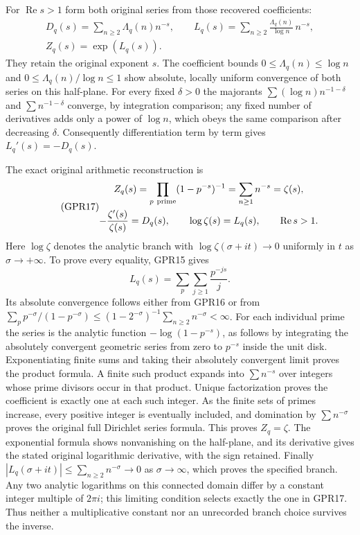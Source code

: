 For $\operatorname{Re}s>1$ form both original series
from those recovered coefficients:
\begin{equation}\tag{GPR16}
 \begin{gathered}
 D_q(s)=\sum_{n\ge2}\Lambda_q(n)n^{-s},\qquad
 L_q(s)=\sum_{n\ge2}\frac{\Lambda_q(n)}{\log n}\,n^{-s},\\
 Z_q(s)=\exp(L_q(s)).
 \end{gathered}
\end{equation}
They retain the original exponent $s$.
The coefficient bounds
$0\le\Lambda_q(n)\le\log n$ and
$0\le\Lambda_q(n)/\log n\le1$
show absolute, locally uniform convergence of both
series on this half-plane. For every fixed
$\delta>0$ the majorants
$\sum(\log n)n^{-1-\delta}$ and
$\sum n^{-1-\delta}$ converge, by integration
comparison; any fixed number of derivatives adds
only a power of $\log n$, which obeys the same
comparison after decreasing $\delta$.
Consequently differentiation term by term gives
$L_q'(s)=-D_q(s)$.

The exact original arithmetic reconstruction is
\begin{equation}\tag{GPR17}
 \begin{gathered}
 Z_q(s)=\prod_{p\ {\rm prime}}(1-p^{-s})^{-1}
       =\sum_{n\ge1}n^{-s}=\zeta(s),\\
 -\frac{\zeta'(s)}{\zeta(s)}=D_q(s),\qquad
 \log\zeta(s)=L_q(s),\qquad \operatorname{Re}s>1.
 \end{gathered}
\end{equation}
Here $\log\zeta$ denotes the analytic branch with
$\log\zeta(\sigma+it)\to0$ uniformly in $t$ as
$\sigma\to+\infty$.
To prove every equality, GPR15 gives
\[
 L_q(s)=\sum_p\sum_{j\ge1}\frac{p^{-js}}j.
\]
Its absolute convergence follows either from GPR16 or
from
$\sum_p p^{-\sigma}/(1-p^{-\sigma})
 \le(1-2^{-\sigma})^{-1}\sum_{n\ge2}n^{-\sigma}<\infty$.
For each individual prime the series is the analytic
function $-\log(1-p^{-s})$, as follows by integrating
the absolutely convergent geometric series from zero
to $p^{-s}$ inside the unit disk.
Exponentiating finite sums and taking their absolutely
convergent limit proves the product formula.
A finite such product expands into
$\sum n^{-s}$ over integers whose prime divisors occur
in that product. Unique factorization proves the
coefficient is exactly one at each such integer.
As the finite sets of primes increase, every positive
integer is eventually included, and domination by
$\sum n^{-\sigma}$ proves the original full Dirichlet
series formula. This proves $Z_q=\zeta$.
The exponential formula shows nonvanishing on the
half-plane, and its derivative gives the stated original
logarithmic derivative, with the sign retained.
Finally $|L_q(\sigma+it)|\le\sum_{n\ge2}n^{-\sigma}\to0$
as $\sigma\to\infty$, which proves the specified branch.
Any two analytic logarithms on this connected domain
differ by a constant integer multiple of $2\pi i$;
this limiting condition selects exactly the one in
GPR17. Thus neither a multiplicative constant nor an
unrecorded branch choice survives the inverse.


